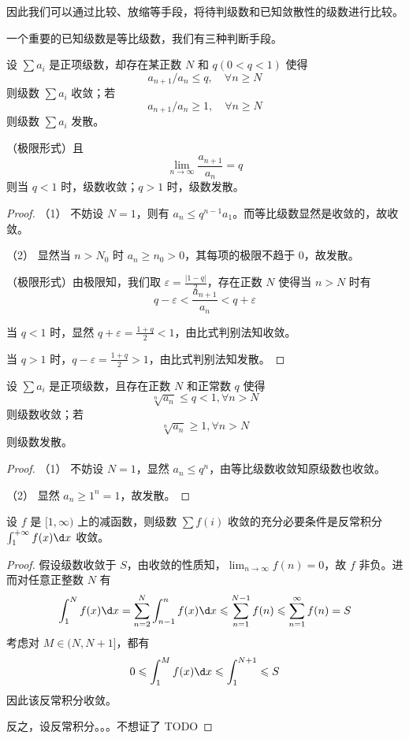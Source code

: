因此我们可以通过比较、放缩等手段，将待判级数和已知敛散性的级数进行比较。

一个重要的已知级数是等比级数，我们有三种判断手段。

\begin{theorem}[比式判别法]
	设 $\sum a_i$ 是正项级数，却存在某正数 $N$ 和 $q(0 < q < 1)$ 使得
	\[ a_{n+1} / a_n \leqslant q, \quad \forall n \geqslant N \]
	则级数 $\sum a_i$ 收敛；若
	\[ a_{n+1} / a_n \geqslant 1, \quad \forall n \geqslant N \]
	则级数 $\sum a_i$ 发散。


	（极限形式）且
	\[ \lim_{n \to \infty} \frac{a_{n+1}}{a_n} = q \]
	则当 $q < 1$ 时，级数收敛；$q > 1$ 时，级数发散。
\end{theorem}

\begin{proof}
	（1） 不妨设 $N = 1$，则有 $a_n \leqslant q^{n-1}a_1$。而等比级数显然是收敛的，故收敛。

	（2） 显然当 $n > N_0$ 时 $a_n \geqslant n_0 > 0$，其每项的极限不趋于 $0$，故发散。

	（极限形式）由极限知，我们取 $\varepsilon = \frac{|1-q|}{2}$，存在正数 $N$ 使得当 $n > N$ 时有
	\[ q - \varepsilon < \frac{a_{n+1}}{a_n} < q + \varepsilon \]

	当 $q<1$ 时，显然 $q + \varepsilon = \frac{1+q}{2} < 1$，由比式判别法知收敛。

	当 $q > 1$ 时，$q - \varepsilon = \frac{1+q}{2} > 1$，由比式判别法知发散。
\end{proof}

\begin{theorem}
	设 $\sum a_i$ 是正项级数，且存在正数 $N$ 和正常数 $q$ 使得
	\[ \sqrt[n]{a_n} \leqslant q < 1, \forall n > N \]
	则级数收敛；若
	\[ \sqrt[n]{a_n} \geqslant 1, \forall n > N \]
	则级数发散。
\end{theorem}

\begin{proof}
	（1） 不妨设 $N=1$，显然 $a_n \leqslant q^n$，由等比级数收敛知原级数也收敛。

	（2） 显然 $a_n \geqslant 1^n = 1$，故发散。
\end{proof}

\begin{theorem}[积分判别法]
	设 $f$ 是 $[1, \infty)$ 上的减函数，则级数 $\sum f(i)$ 收敛的充分必要条件是反常积分 $\int_{1}^{+\infty} f(x) \d x$ 收敛。
\end{theorem}

\begin{proof}
	假设级数收敛于 $S$，由收敛的性质知，$\lim_{n \to \infty} f(n) = 0$，故 $f$ 非负。进而对任意正整数 $N$ 有
	\[ \int_{1}^{N} f(x) \d x = \sum_{n=2}^N \int_{n -1}^{n} f(x) \d x \leqslant \sum_{n=1}^{N-1} f(n) \leqslant \sum_{n=1}^{\infty} f(n) = S \]
	考虑对 $M \in (N, N + 1]$，都有
	\[ 0 \leqslant \int_{1}^{M} f(x) \d x \leqslant \int_{1}^{N+1} \leqslant S \]
	因此该反常积分收敛。

	反之，设反常积分。。。不想证了 TODO
\end{proof}

